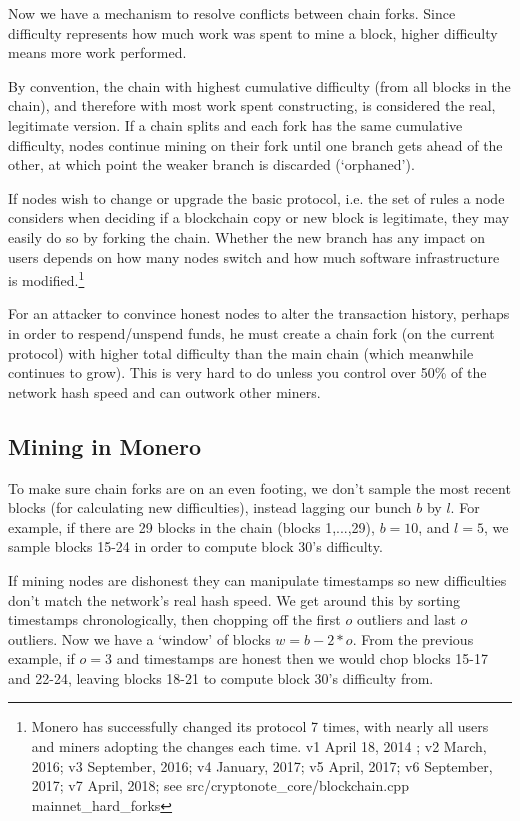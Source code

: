 Now we have a mechanism to resolve conflicts between chain forks. Since difficulty represents how much work was spent to mine a block, higher difficulty means more work performed.

By convention, the chain with highest cumulative difficulty (from all blocks in the chain), and therefore with most work spent constructing, is considered the real, legitimate version. If a chain splits and each fork has the same cumulative difficulty, nodes continue mining on their fork until one branch gets ahead of the other, at which point the weaker branch is discarded (`orphaned').%

If nodes wish to change or upgrade the basic protocol, i.e. the set of rules a node considers when deciding if a blockchain copy or new block is legitimate, they may easily do so by forking the chain. Whether the new branch has any impact on users depends on how many nodes switch and how much software infrastructure is modified.\footnote{Monero has successfully changed its protocol 7 times, with nearly all users and miners adopting the changes each time. v1 April 18, 2014 \cite{bitmonero-launched}; v2 March, 2016; v3 September, 2016; v4 January, 2017; v5 April, 2017; v6 September, 2017; v7 April, 2018; see src/cryptonote\_core/blockchain.cpp mainnet\_hard\_forks}

For an attacker to convince honest nodes to alter the transaction history, perhaps in order to respend/unspend funds, he must create a chain fork (on the current protocol) with higher total difficulty than the main chain (which meanwhile continues to grow). This is very hard to do unless you control over 50\% of the network hash speed and can outwork other miners. \cite{Nakamoto_bitcoin}


\subsection{Mining in Monero} %

To make sure chain forks are on an even footing, we don't sample the most recent blocks (for calculating new difficulties), instead lagging our bunch $b$ by $l$. For example, if there are 29 blocks in the chain (blocks 1,...,29), $b = 10$, and $l = 5$, we sample blocks 15-24 in order to compute block 30's difficulty.

If mining nodes are dishonest they can manipulate timestamps so new difficulties don't match the network's real hash speed. We get around this by sorting timestamps chronologically, then chopping off the first $o$ outliers and last $o$ outliers. Now we have a `window' of blocks $w = b-2*o$. From the previous example, if $o = 3$ and timestamps are honest then we would chop blocks 15-17 and 22-24, leaving blocks 18-21 to compute block 30's difficulty from.

